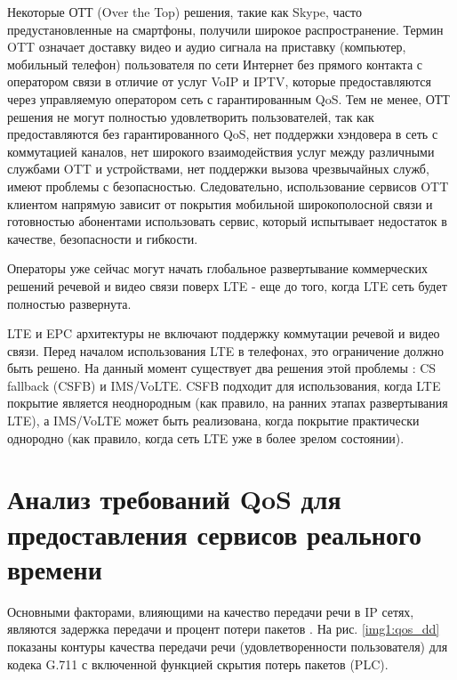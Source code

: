 Некоторые ОТТ (Over the Top) решения, такие как Skype, часто предустановленные на смартфоны, получили широкое распространение. Термин OTT означает доставку видео и аудио сигнала на приставку (компьютер, мобильный телефон) пользователя по сети Интернет без прямого контакта с оператором связи в отличие от услуг VoIP и IPTV, которые предоставляются через управляемую оператором сеть с гарантированным QoS. Тем не менее, ОТТ решения не могут полностью удовлетворить пользователей, так как предоставляются без гарантированного QoS, нет поддержки хэндовера в сеть с коммутацией каналов, нет широкого взаимодействия услуг между различными службами OTT и устройствами, нет поддержки вызова чрезвычайных служб, имеют проблемы с безопасностью. Следовательно, использование сервисов OTT клиентом напрямую зависит от покрытия мобильной широкополосной связи и готовностью абонентами использовать сервис, который испытывает недостаток в качестве, безопасности и гибкости. 

Операторы уже сейчас могут начать глобальное развертывание коммерческих решений речевой и видео связи поверх LTE - еще до того, когда LTE сеть будет полностью развернута.

LTE и EPC архитектуры не включают поддержку коммутации речевой и видео связи. 
Перед началом использования LTE в телефонах, это ограничение должно быть решено. На данный момент существует два решения этой проблемы \cite{ericsson_backgrounder}: CS fallback (CSFB) и IMS/VoLTE. CSFB подходит для использования, когда LTE покрытие является неоднородным (как правило, на ранних этапах развертывания LTE), а IMS/VoLTE может быть реализована, когда покрытие практически однородно (как правило, когда сеть LTE уже в более зрелом состоянии).






\section{Анализ требований QoS для предоставления сервисов реального времени } \label{sect_qos}

Основными факторами,  влияющими на качество передачи речи в IP  сетях,  являются задержка передачи и процент потери пакетов \cite{G114}.
На рис. \ref{img1:qos_dd} показаны контуры качества передачи речи (удовлетворенности пользователя) для кодека G.711 с включенной функцией скрытия потерь пакетов (PLC).

